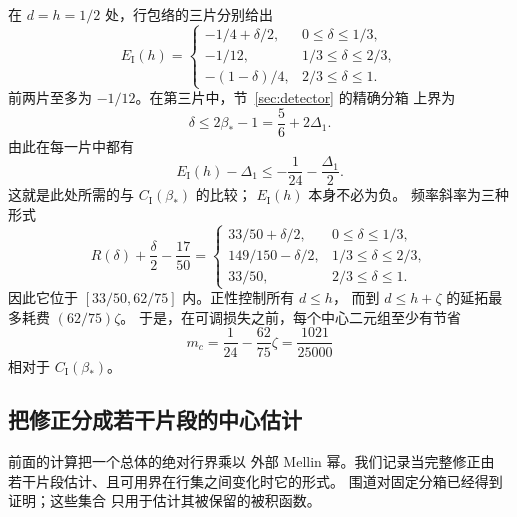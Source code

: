 \documentclass[11pt,a4paper]{article}
\numberwithin{equation}{section}
\numberwithin{figure}{section}
\theoremstyle{definition}
\theoremstyle{remark}
\begin{document}
在 $d=h=1/2$ 处，行包络的三片分别给出
\[
 E_{\mathrm I}(h)=
 \begin{cases}
  -1/4+\delta/2,&0\le\delta\le1/3,\\
  -1/12,&1/3\le\delta\le2/3,\\
  -(1-\delta)/4,&2/3\le\delta\le1.
 \end{cases}
\]
前两片至多为 $-1/12$。在第三片中，节~\ref{sec:detector} 的精确分箱
上界为
\[
 \delta\le2\beta_*-1=\frac56+2\Delta_1.
\]
由此在每一片中都有
\[
 E_{\mathrm I}(h)-\Delta_1
 \le-\frac1{24}-\frac{\Delta_1}{2}.
\]
这就是此处所需的与 $C_{\mathrm I}(\beta_*)$ 的比较；
$E_{\mathrm I}(h)$ 本身不必为负。
频率斜率为三种形式
\[
 R(\delta)+\frac\delta2-\frac{17}{50}
 =\begin{cases}
  33/50+\delta/2,&0\le\delta\le1/3,\\
  149/150-\delta/2,&1/3\le\delta\le2/3,\\
  33/50,&2/3\le\delta\le1.
 \end{cases}
\]
因此它位于 $[33/50,62/75]$ 内。正性控制所有 $d\le h$，
而到 $d\le h+\zeta$ 的延拓最多耗费 $(62/75)\zeta$。
于是，在可调损失之前，每个中心二元组至少有节省
\[
 m_c=\frac1{24}-\frac{62}{75}\zeta=\frac{1021}{25000}
\]
相对于 $C_{\mathrm I}(\beta_*)$。

\subsection{把修正分成若干片段的中心估计}

前面的计算把一个总体的绝对行界乘以
外部 Mellin 幂。我们记录当完整修正由
若干片段估计、且可用界在行集之间变化时它的形式。
围道对固定分箱已经得到证明；这些集合
只用于估计其被保留的被积函数。
\end{document}
